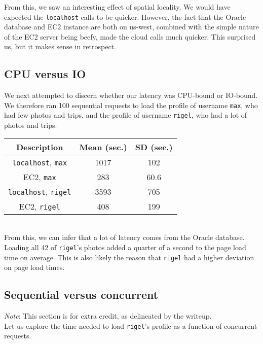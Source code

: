 \documentclass[11pt]{amsart}
\begin{document}
From this, we saw an interesting effect of spatial locality. We would have expected the
{\tt localhost} calls to be quicker. However, the fact that the Oracle database and EC2 instance
are both on us-west, combined with the simple nature of the EC2 server being beefy, made the
cloud calls much quicker. This surprised us, but it makes sense in retrospect.

\subsection{CPU versus IO}
We next attempted to discern whether our latency was CPU-bound or IO-bound. We therefore ran 100 
sequential requests to load the profile of username {\tt max}, who had few photos and trips, and the profile of username {\tt rigel}, who had a lot of photos and trips. \\

\begin{tabular}{|c|c|c|}
  \hline {\bf Description} & {\bf Mean (sec.)} & {\bf SD (sec.)} \\
  \hline {\tt localhost}, {\tt max} & 1017 & 102 \\
  \hline EC2, {\tt max} & 283 & 60.6 \\
  \hline {\tt localhost}, {\tt rigel} & 3593 & 705 \\
  \hline EC2, {\tt rigel} & 408 & 199 \\
  \hline
\end{tabular} \\

From this, we can infer that a lot of latency comes from the Oracle database. Loading all 42 of
{\tt rigel}'s photos added a quarter of a second to the page load time on average. This is also
likely the reason that {\tt rigel} had a higher deviation on page load times.

\subsection{Sequential versus concurrent}
{\em Note}: This section is for extra credit, as delineated by the writeup. \\

Let us explore the time needed to load {\tt rigel}'s profile as a function of concurrent requests. \\
\end{document}
